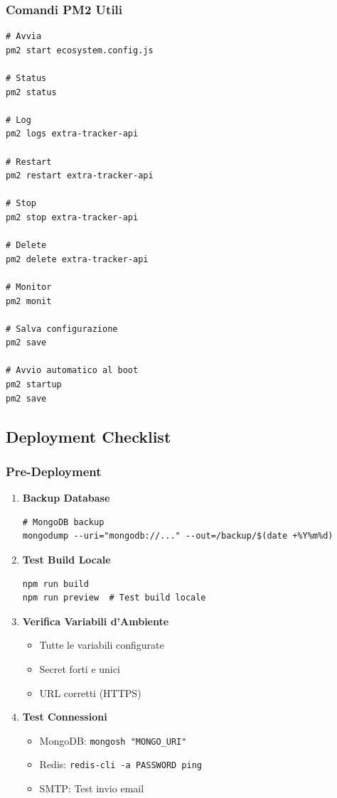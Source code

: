 \documentclass[11pt,a4paper]{article}
\newcommand{\code}[1]{\texttt{#1}}
\begin{document}
\subsubsection{Comandi PM2 Utili}

\begin{lstlisting}[caption=Comandi PM2]
# Avvia
pm2 start ecosystem.config.js

# Status
pm2 status

# Log
pm2 logs extra-tracker-api

# Restart
pm2 restart extra-tracker-api

# Stop
pm2 stop extra-tracker-api

# Delete
pm2 delete extra-tracker-api

# Monitor
pm2 monit

# Salva configurazione
pm2 save

# Avvio automatico al boot
pm2 startup
pm2 save
\end{lstlisting}

\subsection{Deployment Checklist}

\subsubsection{Pre-Deployment}

\begin{enumerate}
    \item \textbf{Backup Database}
    \begin{lstlisting}
# MongoDB backup
mongodump --uri="mongodb://..." --out=/backup/$(date +%Y%m%d)
    \end{lstlisting}
    
    \item \textbf{Test Build Locale}
    \begin{lstlisting}
npm run build
npm run preview  # Test build locale
    \end{lstlisting}
    
    \item \textbf{Verifica Variabili d'Ambiente}
    \begin{itemize}
        \item Tutte le variabili configurate
        \item Secret forti e unici
        \item URL corretti (HTTPS)
    \end{itemize}
    
    \item \textbf{Test Connessioni}
    \begin{itemize}
        \item MongoDB: \code{mongosh "MONGO_URI"}
        \item Redis: \code{redis-cli -a PASSWORD ping}
        \item SMTP: Test invio email
    \end{itemize}
\end{enumerate}
\end{document}
